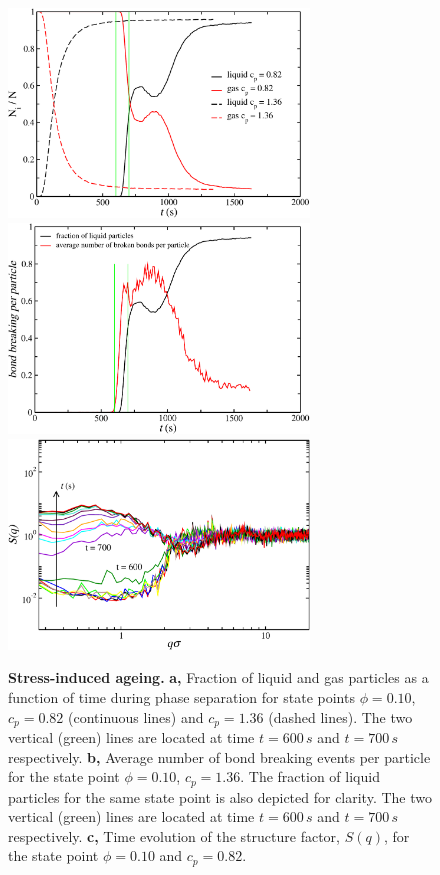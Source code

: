 \documentclass[a4paper,preprint,superscriptaddress]{revtex4}
\begin{document}
\begin{figure}[!t]
 \centering
 \includegraphics[width=8cm]{oldfig/fig2a}
  \includegraphics[width=8cm]{oldfig/fig2b}
  \includegraphics[width=8cm]{oldfig/fig2c}
 \caption{{\bf Stress-induced ageing.} {\bf a,} Fraction of liquid and gas particles as a function of time during phase separation for state points
 $\phi=0.10$, $c_p=0.82$ (continuous lines) and $c_p=1.36$ (dashed lines). The two vertical (green) lines are located at time $t=600\,s$ and $t=700\,s$
 respectively. {\bf b,} Average number of bond breaking events
 per particle for the state point $\phi=0.10$, $c_p=1.36$. The fraction of liquid particles for the same state point
 is also depicted for clarity. The two vertical (green) lines are located at time $t=600\,s$ and $t=700\,s$
 respectively.
{\bf c,} Time evolution of the structure factor, $S(q)$, for the state point $\phi=0.10$ and $c_p=0.82$.}
 \label{fig:stress}
\end{figure}
\end{document}
